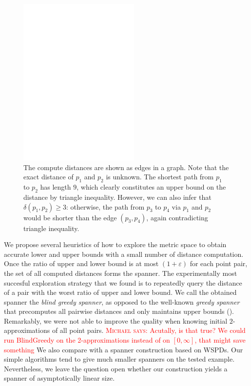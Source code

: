 \documentclass[a4paper,USenglish]{socg-lipics-v2018}
\newcommand{\eps}{\varepsilon}
\newcommand{\dist}{\delta}
\def\marrow{\marginpar[\hfill$\longrightarrow$]{$\longleftarrow$}}
\def\michael#1{\textcolor{red}{\textsc{Michael says: }{\marrow\sf #1}}}
\begin{document}
\begin{figure}[h]
\centering
\includegraphics[width=6cm]{intro_example.eps}
\caption{The compute distances are shown as edges in a graph. Note that the exact distance
of $p_1$ and $p_2$ is unknown. The shortest path from $p_1$ to $p_2$ has length $9$, which clearly
constitutes an upper bound on the distance by triangle inequality.
However, we can also infer that $\dist(p_1,p_2)\geq 3$:
otherwise, the path from $p_3$ to $p_4$ via $p_1$ and $p_2$
would be shorter than the edge $(p_3,p_4)$, again contradicting
triangle inequality.}
\label{fig:1st_example}
\end{figure}

We propose several heuristics of how to explore the metric space to obtain accurate lower and upper bounds
with a small number of distance computation. Once the ratio of upper and lower bound is at most $(1+\eps)$
for each point pair, the set of all computed distances forms the spanner.
The experimentally most succesful exploration strategy that we found is to
repeatedly query the distance of a pair with the worst ratio of upper and lower bound.
We call the obtained spanner the \emph{blind greedy spanner}, as opposed to the well-known
\emph{greedy spanner} that precomputes all pairwise distances and only maintains upper bounds (\cite{althofer1993sparse}).
Remarkably, we were not able to improve the quality when knowing initial $2$-approximations of all point pairs.
\michael{Acutally, is that true? We could run BlindGreedy on the 2-approximations instead of on $[0,\infty]$,
that might save something}
We also compare with a spanner construction based on WSPDs. Our simple algorithms tend to give much smaller
spanners on the tested example. Nevertheless, we leave the question open whether our construction
yields a spanner of asymptotically linear size.
\end{document}
